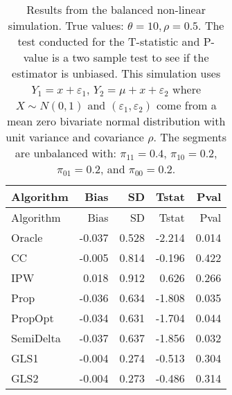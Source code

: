 \documentclass[
  letterpaper,
  DIV=11,
  numbers=noendperiod]{scrartcl}
\begin{document}
\begin{longtable}[]{@{}lrrrr@{}}
\caption{Results from the balanced non-linear simulation. True values:
\(\theta = 10, \rho = 0.5\). The test conducted for the T-statistic and
P-value is a two sample test to see if the estimator is unbiased. This
simulation uses \(Y_1 = x + \varepsilon_1\),
\(Y_2 = \mu + x + \varepsilon_2\) where \(X \sim N(0, 1)\) and
\((\varepsilon_1, \varepsilon_2)\) come from a mean zero bivariate
normal distribution with unit variance and covariance \(\rho\). The
segments are unbalanced with: \(\pi_{11} = 0.4\), \(\pi_{10} = 0.2\),
\(\pi_{01} = 0.2\), and \(\pi_{00} = 0.2\). }\tabularnewline
\toprule\noalign{}
Algorithm & Bias & SD & Tstat & Pval \\
\midrule\noalign{}
\endfirsthead
\toprule\noalign{}
Algorithm & Bias & SD & Tstat & Pval \\
\midrule\noalign{}
\endhead
\bottomrule\noalign{}
\endlastfoot
Oracle & -0.037 & 0.528 & -2.214 & 0.014 \\
CC & -0.005 & 0.814 & -0.196 & 0.422 \\
IPW & 0.018 & 0.912 & 0.626 & 0.266 \\
Prop & -0.036 & 0.634 & -1.808 & 0.035 \\
PropOpt & -0.034 & 0.631 & -1.704 & 0.044 \\
SemiDelta & -0.037 & 0.637 & -1.856 & 0.032 \\
GLS1 & -0.004 & 0.274 & -0.513 & 0.304 \\
GLS2 & -0.004 & 0.273 & -0.486 & 0.314 \\
\end{longtable}
\end{document}
